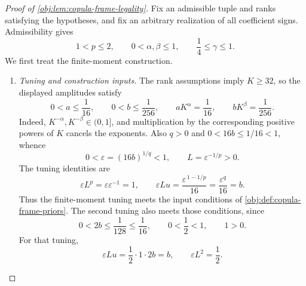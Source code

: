 \begin{proof}[Proof of \cref{obj:lem:copula-frame-legality}]
Fix an admissible tuple and ranks satisfying the hypotheses, and fix an arbitrary realization of all coefficient signs. Admissibility gives
\[
1<p\le2,\qquad
0<\alpha,\beta\le1,\qquad
\frac14\le\gamma\le1.
\]
We first treat the finite-moment construction.

\begin{enumerate}
\item \textit{Tuning and construction inputs.}
The rank assumptions imply \(K\ge32\), so the displayed amplitudes satisfy
\[
0<a\le\frac1{16},\qquad
0<b\le\frac1{256},\qquad
aK^\alpha=\frac1{16},\qquad
bK^\beta=\frac1{256}.
\]
Indeed, \(K^{-\alpha},K^{-\beta}\in(0,1]\), and multiplication by the corresponding positive powers of \(K\) cancels the exponents. Also \(q>0\) and \(0<16b\le1/16<1\), whence
\[
0<\varepsilon=(16b)^{1/q}<1,\qquad
L=\varepsilon^{-1/p}>0.
\]
The tuning identities are
\[
\varepsilon L^p
=\varepsilon\varepsilon^{-1}=1,
\qquad
\varepsilon Lu
=\frac{\varepsilon^{\,1-1/p}}{16}
=\frac{\varepsilon^q}{16}
=b.
\]
Thus the finite-moment tuning meets the input conditions of
\cref{obj:def:copula-frame-priors}. The second tuning also meets those conditions, since
\[
0<2b\le\frac1{128}\le\frac1{16},
\qquad
0<\frac12<1,\qquad 1>0.
\]
For that tuning,
\[
\varepsilon Lu=\frac12\cdot1\cdot2b=b,
\qquad
\varepsilon L^2=\frac12.
\]


\end{enumerate}
\end{proof}
